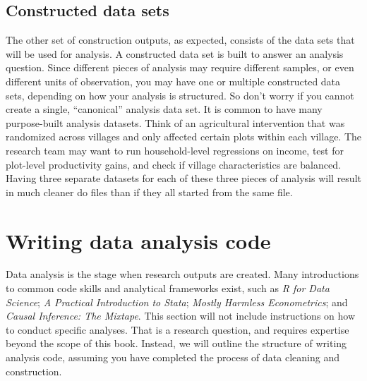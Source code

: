 \subsection{Constructed data sets}

The other set of construction outputs, as expected, consists of the data sets that will be used for analysis.
A constructed data set is built to answer an analysis question.
Since different pieces of analysis may require different samples, or even different units of observation,
you may have one or multiple constructed data sets, depending on how your analysis is structured.
So don't worry if you cannot create a single, ``canonical'' analysis data set.
It is common to have many purpose-built analysis datasets.
Think of an agricultural intervention that was randomized across villages and only affected certain plots within each village. 
The research team may want to run household-level regressions on income, test for plot-level productivity gains, and check if village characteristics are balanced.
Having three separate datasets for each of these three pieces of analysis will result in much cleaner do files than if they all started from the same file. 


\section{Writing data analysis code}

Data analysis is the stage when research outputs are created. 
Many introductions to common code skills and analytical frameworks exist, such as
\textit{R for Data Science};
\textit{A Practical Introduction to Stata};
\textit{Mostly Harmless Econometrics}; 
and \textit{Causal Inference: The Mixtape}.
This section will not include instructions on how to conduct specific analyses.
That is a research question, and requires expertise beyond the scope of this book.
Instead, we will outline the structure of writing analysis code,
assuming you have completed the process of data cleaning and construction.

